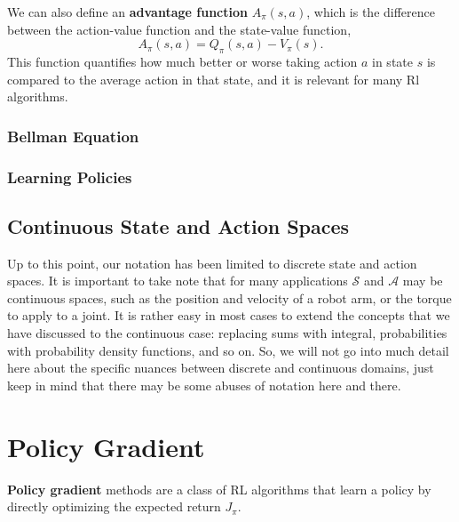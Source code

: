 \documentclass[12pt]{report}
\theoremstyle{definition}
\theoremstyle{remark}
\begin{document}
We can also define an \textbf{advantage function} $A_\pi(s, a)$, which is the difference between the action-value function and the state-value function,
\begin{equation}
    A_\pi(s, a) = Q_\pi(s, a) - V_\pi(s).
\end{equation}
This function quantifies how much better or worse taking action $a$ in state $s$ is compared to the average action in that state, and it is relevant for many Rl algorithms.

\subsubsection{Bellman Equation}

\subsubsection{Learning Policies}

\subsection{Continuous State and Action Spaces}
Up to this point, our notation has been limited to discrete state and action spaces. It is important to take note that for many applications $\mathcal{S}$ and $\mathcal{A}$ may be continuous spaces, such as the position and velocity of a robot arm, or the torque to apply to a joint. It is rather easy in most cases to extend the concepts that we have discussed to the continuous case: replacing sums with integral, probabilities with probability density functions, and so on. So, we will not go into much detail here about the specific nuances between discrete and continuous domains, just keep in mind that there may be some abuses of notation here and there.

\section{Policy Gradient}
\textbf{Policy gradient} methods are a class of RL algorithms that learn a policy by directly optimizing the expected return $J_\pi$.
\end{document}
